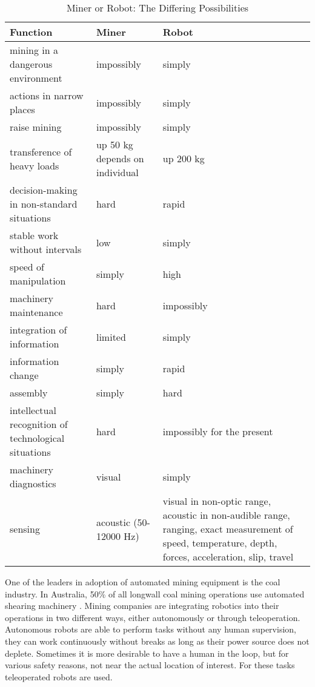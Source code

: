 \begin{center}
\begin{table}[ht!]
\caption[]{Miner or Robot: The Differing Possibilities \cite{table}}
\small
\hfill{}
\resizebox{6.5in}{!} {
\begin{tabular}{p{3in} p{2.5in} p{2in} p{3in}}
\toprule
Function & Miner & Robot\\
\midrule
mining in a dangerous environment & impossibly & simply\\
actions in narrow places & impossibly & simply\\
raise mining & impossibly & simply\\
transference of heavy loads & up 50 kg depends on individual & up 200 kg\\
decision-making in non-standard situations & hard & rapid\\
stable work without intervals & low & simply\\
speed of manipulation & simply & high\\
machinery maintenance & hard & impossibly\\
integration of information & limited & simply\\
information change & simply & rapid\\
assembly & simply & hard\\
intellectual recognition of technological situations & hard & impossibly for the present\\
machinery diagnostics & visual & simply\\
sensing & acoustic (50-12000 Hz) & visual in non-optic range, acoustic in non-audible range, ranging, exact measurement of speed, temperature, depth, forces, acceleration, slip, travel\\
\bottomrule
\end{tabular}
}
\hfill{}
\label{tab:table}
\end{table}
\end{center}

One of the leaders in adoption of automated mining equipment is the coal industry. In Australia, 50\% of all longwall coal mining operations use automated shearing machinery \cite{auswall}. Mining companies are integrating robotics into their operations in two different ways, either autonomously or through teleoperation. Autonomous robots are able to perform tasks without any human supervision, they can work continuously without breaks as long as their power source does not deplete. Sometimes it is more desirable to have a human in the loop, but for various safety reasons, not near the actual location of interest. For these tasks teleoperated robots are used.\\

